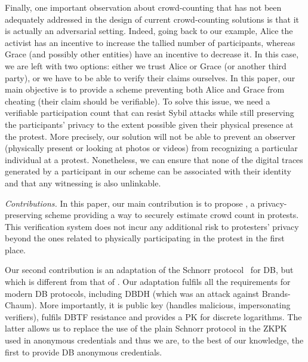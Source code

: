 Finally, one important observation about crowd-counting that has not been adequately addressed in the design of current crowd-counting solutions is that it is actually an adversarial setting. 
Indeed, going back to our example, Alice the activist has an incentive to increase the tallied number of participants, whereas Grace (and possibly other entities) have an incentive to decrease it.
In this case, we are left with two options: either we trust Alice or Grace (or 
another third party), or we have to be able to verify their claims ourselves.
In this paper, our main objective is to provide a scheme preventing both Alice and Grace from cheating (\ie their claim should be verifiable).
To solve this issue, we need a verifiable participation count that can resist Sybil attacks while still preserving the participants'
privacy to the extent possible given their physical presence at the protest. 
More precisely, our solution will not be able to prevent an observer 
(physically present or looking at photos or videos) from recognizing a 
particular individual at a protest. Nonetheless, we can ensure that none of the 
digital traces generated by a participant in our scheme can be associated with 
their identity and that any witnessing is also unlinkable.

\emph{Contributions.} In this paper, our main contribution is to propose 
\PRIVO, a privacy-preserving scheme providing a way to securely estimate crowd 
count in protests.
This verification system does not incur any additional risk to protesters' privacy beyond the ones related to physically participating in the protest in the first place.

Our second contribution is an adaptation of the Schnorr protocol~\cite{Schnorr} 
for \ac{DB}, but which is different from that of \textcite{DistanceBounding}.
Our adaptation fulfils all the requirements for modern \ac{DB} protocols, 
including \ac{DBDH} (which was an attack against Brands-Chaum).
More importantly, it is public key (\ie handles malicious, impersonating 
verifiers), fulfils \ac{DBTF} resistance and provides a \ac{PK} for discrete logarithms.
The latter allows us to replace the use of the plain Schnorr protocol in the 
\ac{ZKPK} used in anonymous credentials and thus we are, to the best of our 
knowledge, the first to provide \ac{DB} anonymous credentials.

